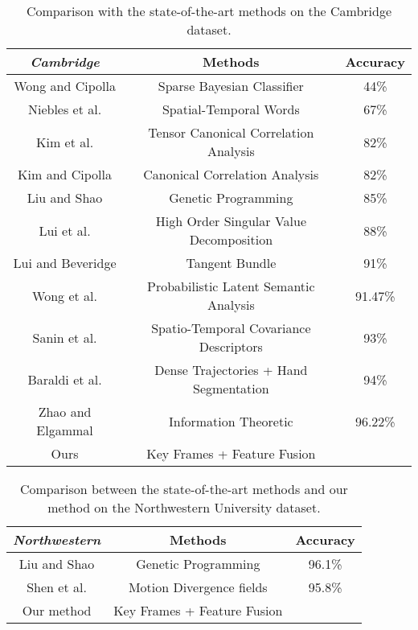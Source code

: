 \documentclass[5p]{elsarticle}
\begin{document}
\begin{table*}[!tbp]
	\caption{Comparison with the state-of-the-art methods on the Cambridge dataset.}
	\centering
\begin{tabular}{c|c|c}
		\hline
		\emph{Cambridge}                             & Methods                                 & Accuracy \\ \hline 
		Wong and Cipolla \cite{wong2005real}         & Sparse Bayesian Classifier              & 44\%  \\ 
		Niebles et al. \cite{niebles2008unsupervised}& Spatial-Temporal Words                  & 67\% \\
		Kim et al. \cite{kim2007tensor}              & Tensor Canonical Correlation Analysis   & 82\% \\
		Kim and Cipolla \cite{kim2009canonical}      & Canonical Correlation Analysis          & 82\% \\
		Liu and Shao \cite{liu2013synthesis}         & Genetic Programming                     & 85\% \\
		Lui et al. \cite{lui2010action}              & High Order Singular Value Decomposition & 88\% \\
		Lui and Beveridge \cite{lui2011tangent}      & Tangent Bundle                          & 91\% \\
		Wong et al. \cite{wong2007learning}          & Probabilistic Latent Semantic Analysis  & 91.47\% \\
		Sanin et al. \cite{sanin2013spatio}          & Spatio-Temporal Covariance Descriptors  & 93\% \\
		Baraldi et al. \cite{baraldi2014gesture}     & Dense Trajectories + Hand Segmentation  & 94\% \\
		Zhao and Elgammal \cite{zhao2008information} & Information Theoretic                   & 96.22\% \\ \hline
		Ours                                   & Key Frames + Feature Fusion &\bm{$98.23\% \pm 0.84\%$} \\ \hline
	\end{tabular}
	\label{Tab:cambridge}
\end{table*}

\begin{table*}[!tbp]
	\caption{Comparison between the state-of-the-art methods and our method on the Northwestern University dataset.}
	\centering
\begin{tabular}{c|c|c}
		\hline
		\emph{Northwestern}                  & Methods                     & Accuracy \\ \hline 
		Liu and Shao \cite{liu2013synthesis} & Genetic Programming         & 96.1\%  \\
		Shen et al. \cite{shen2012dynamic}   & Motion Divergence fields    & 95.8\%  \\ \hline
		Our method                           & Key Frames + Feature Fusion & \bm{$96.89\% \pm 1.08\%$}  \\ \hline
	\end{tabular}
	\label{Tab:northwestern}
\end{table*}
\end{document}
